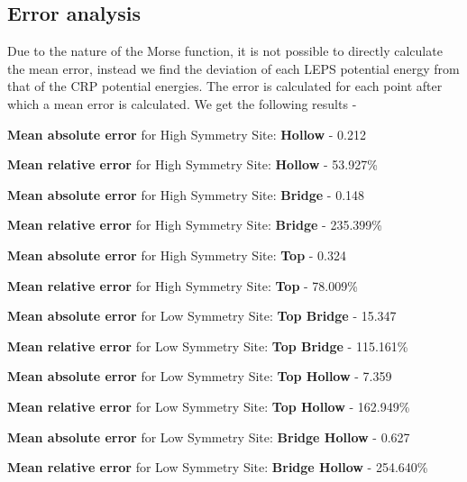 \documentclass[12pt]{article}
\begin{document}
\subsection{Error analysis}
\vspace{5mm}
Due to the nature of the Morse function, it is not possible to directly calculate the mean error, instead we find the deviation of each LEPS potential energy from that of the CRP potential energies. The error is calculated for each point after which a mean error is calculated. We get the following results - 

\vspace{5mm}
\begin{center}
      
  \textbf{Mean absolute error} for High Symmetry Site: \textbf{Hollow} -   0.212
  
  \textbf{Mean relative error} for High Symmetry Site: \textbf{Hollow} -    53.927\% 
  
  \vspace{5mm}
  
  \textbf{Mean absolute error} for High Symmetry Site: \textbf{Bridge} -   0.148     
  
 \textbf{ Mean relative error} for High Symmetry Site: \textbf{Bridge} -    235.399\% 
  
  \vspace{5mm}
  
  \textbf{Mean absolute error} for High Symmetry Site: \textbf{Top} -   0.324
  
 \textbf{ Mean relative error} for High Symmetry Site:\textbf{ Top} -    78.009\%
  
  \vspace{5mm}
  
  \textbf{Mean absolute error} for Low Symmetry Site: \textbf{Top Bridge} -  15.347   
  
  \textbf{Mean relative error} for Low Symmetry Site: \textbf{Top Bridge} - 115.161\%
  
  \vspace{5mm}
  
  
  \textbf{Mean absolute error} for Low Symmetry Site: \textbf{Top Hollow} - 7.359  
  
  \textbf{Mean relative error} for Low Symmetry Site:\textbf{ Top Hollow }- 162.949\%
  
  \vspace{5mm}
  
  
  \textbf{Mean absolute error} for Low Symmetry Site: \textbf{Bridge Hollow} - 0.627
  
  \textbf{Mean relative error} for Low Symmetry Site: \textbf{Bridge Hollow }- 254.640\%
  

\end{center}
\end{document}
